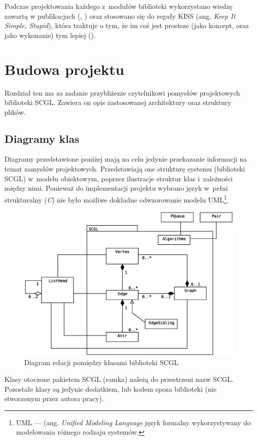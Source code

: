 \documentclass[a4paper,12pt,polish,oneside,openright]{thesis}
\begin{document}
Podczas projektowania każdego z~modułów biblioteki wykorzystano wiedzę zawartą w publikacjach (\cite{unix}, \cite{ansi}) oraz stosowano się do reguły KISS (ang. \emph{Keep It Simple, Stupid}), która traktuje o tym, że im coś jest prostsze (jako koncept, oraz jako wykonanie) tym lepiej (\cite{unix}).
\label{kiss}

\section{Budowa projektu}
Rozdział ten ma za zadanie przybliżenie czytelnikowi pomysłów projektowych biblioteki SCGL.
Zawiera on opis zastosowanej architektury oraz struktury plików.
\subsection{Diagramy klas}
Diagramy przedstawione poniżej mają na celu jedynie przekazanie informacji na temat zamysłów projektowych.
Przedstawiają one strukturę systemu (biblioteki SCGL) w~modelu obiektowym, poprzez ilustracje struktur klas i~zależności między nimi.
Ponieważ do implementacji projektu wybrano język w~pełni strukturalny (\emph{C}) nie było możliwe dokładne odwzorowanie modelu UML\footnote{UML --- (ang. \emph{Unified Modeling Language} język formalny wykorzystywany do modelowania różnego rodzaju systemów.}.

\begin{figure}[htb]
	\begin{center}
		\includegraphics[width=1.00\textwidth]{class_01.eps}
		\caption{Diagram relacji pomiędzy klasami biblioteki SCGL}
	\end{center}
\end{figure}
Klasy otoczone pakietem SCGL (ramka) należą do przestrzeni nazw SCGL.
Pozostałe klasy są jedynie dodatkiem, lub kodem spoza biblioteki (nie stworzonym przez autora pracy).
\end{document}
